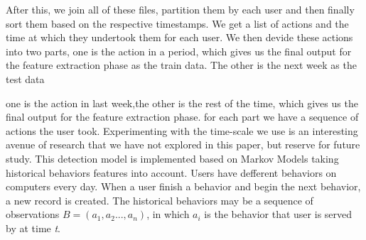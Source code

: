 \documentclass[conference]{IEEEtran}
\begin{document}
After this, we join all of these files, partition them by each user and then finally sort them based on the respective timestamps. We get a list of actions and the time at which they undertook them for each user.
We then devide these actions into two parts, one is the action in a period, which gives us the final output for the feature extraction phase as the train data. The other is the next week as the test data

one is the action in last week,the other is the rest of the time, which gives us the final output for the feature extraction phase. for each part we have a sequence of actions the user took. Experimenting with the time-scale we use is an interesting avenue of research that we have not explored in this paper, but reserve for future study. 
\fi
This detection model is implemented based on Markov Models
taking historical behaviors features into account. Users have defferent behaviors on computers every day. When a user finish a behavior and begin the next behavior, a new record is created. 
The historical behaviors may be a sequence of observations \emph{$B=(a_1,a_2...,a_n)$}, in which \emph{$a_i$} is the behavior that user is served by at time \emph{t}. 
\end{document}
